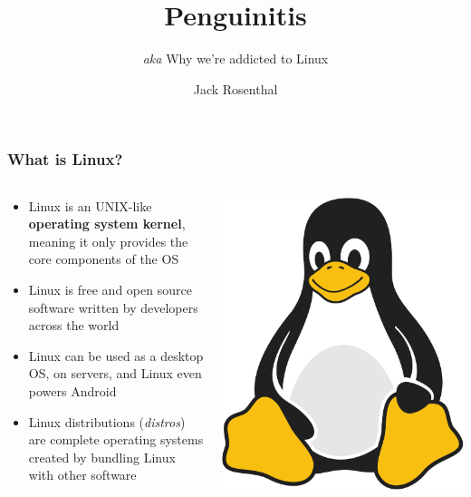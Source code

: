 \documentclass{lug}
\title{Penguinitis}
\subtitle{\emph{aka} Why we're addicted to Linux}
\author{Jack Rosenthal}
\begin{document}
\begin{frame}
    \frametitle{What is Linux?}

    \begin{columns}
        \begin{column}{0.7\textwidth}
        \begin{itemize}[<+->]
            \setlength\itemsep{1em}
            \item Linux is an UNIX-like \textbf{operating system kernel},
                meaning it only provides the core components of the OS
            \item Linux is free and open source software written by developers
                across the world
            \item Linux can be used as a desktop OS, on servers, and Linux even
                powers Android
            \item Linux distributions (\emph{distros}) are complete operating
                systems created by bundling Linux with other software
        \end{itemize}
        \end{column}

        \begin{column}{0.3\textwidth}
            \includegraphics[width=\textwidth]{graphics/TuxFlat}
        \end{column}
    \end{columns}
\end{frame}
\end{document}
